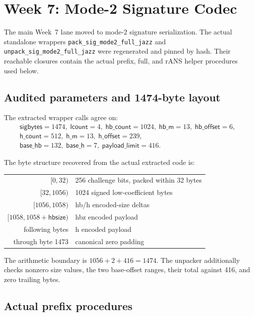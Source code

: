 \section{Week 7: Mode-2 Signature Codec}

The main Week~7 lane moved to mode-2 signature serialization. The actual
standalone wrappers \texttt{pack\_sig\_mode2\_full\_jazz} and
\texttt{unpack\_sig\_mode2\_full\_jazz} were regenerated and pinned by hash.
Their reachable closures contain the actual prefix, full, and rANS helper
procedures used below.

\subsection*{Audited parameters and 1474-byte layout}

The extracted wrapper calls agree on:
\[
\begin{array}{l}
\mathsf{sigbytes}=1474,\;
\mathsf{lcount}=4,\;
\mathsf{hb\_count}=1024,\;
\mathsf{hb\_m}=13,\;
\mathsf{hb\_offset}=6,\\
\mathsf{h\_count}=512,\;
\mathsf{h\_m}=13,\;
\mathsf{h\_offset}=239,\\
\mathsf{base\_hb}=132,\;
\mathsf{base\_h}=7,\;
\mathsf{payload\_limit}=416.
\end{array}
\]

The byte structure recovered from the actual extracted code is:
\begin{center}
\begin{tabular}{r l}
$[0,32)$ & 256 challenge bits, packed within 32 bytes \\
$[32,1056)$ & 1024 signed low-coefficient bytes \\
$[1056,1058)$ & hb/h encoded-size deltas \\
$[1058,1058+\mathsf{hbsize})$ & hbz encoded payload \\
following bytes & h encoded payload \\
through byte 1473 & canonical zero padding
\end{tabular}
\end{center}
The arithmetic boundary is $1056+2+416=1474$. The unpacker additionally
checks nonzero size values, the two base-offset ranges, their total against
416, and zero trailing bytes.

\subsection*{Actual prefix procedures}

